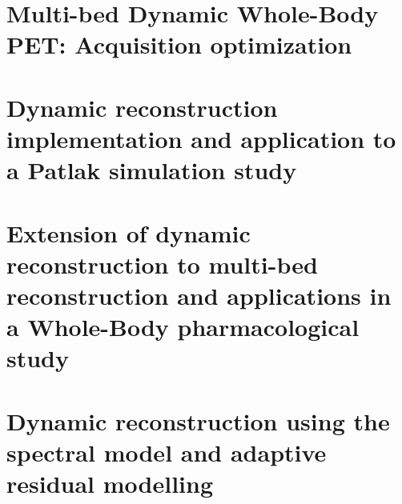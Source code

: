 
\chapter{Multi-bed Dynamic Whole-Body PET: Acquisition optimization}
\label{Chap3_1:AcquisitionOptimization}


\chapter{Dynamic reconstruction implementation and application to a Patlak simulation study}
\label{Chap3_2:SimStudy}


\chapter{Extension of dynamic reconstruction to multi-bed reconstruction and applications in a Whole-Body pharmacological study}
\label{Chap3_3:IsotoPK}


\chapter{Dynamic reconstruction using the spectral model and adaptive residual modelling}
\label{Chap3_4:Residual}
